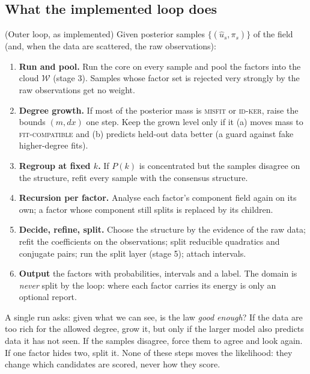 \subsection{What the implemented loop does}
\begin{theorem}{(Outer loop, as implemented)  \impl}\label{thm:loop}
Given posterior samples $\{(\hat u_s,\pi_s)\}$ of the field (and, when the data are scattered, the raw observations):
\begin{enumerate}[nosep]
\item \textbf{Run and pool.} Run the core on every sample and pool the factors into the cloud $\mathcal W$ (stage 3). Samples whose factor set is rejected very strongly by the raw observations get no weight.
\item \textbf{Degree growth.} If most of the posterior mass is \textsc{misfit} or \textsc{id-ker}, raise the bounds $(m,dx)$ one step. Keep the grown level only if it (a) moves mass to \textsc{fit-compatible} and (b) predicts held-out data better (a guard against fake higher-degree fits).
\item \textbf{Regroup at fixed $k$.} If $P(k)$ is concentrated but the samples disagree on the structure, refit every sample with the consensus structure.
\item \textbf{Recursion per factor.} Analyse each factor's component field again on its own; a factor whose component still splits is replaced by its children.
\item \textbf{Decide, refine, split.} Choose the structure by the evidence of the raw data; refit the coefficients on the observations; split reducible quadratics and conjugate pairs; run the split layer (stage 5); attach intervals.
\item \textbf{Output} the factors with probabilities, intervals and a label. The domain is \emph{never} split by the loop: where each factor carries its energy is only an optional report.
\end{enumerate}
\end{theorem}
\begin{intuition}
A single run asks: given what we can see, is the law \emph{good enough}? If the data are too rich for the allowed degree, grow it, but only if the larger model also predicts data it has not seen. If the samples disagree, force them to agree and look again. If one factor hides two, split it. None of these steps moves the likelihood: they change which candidates are scored, never how they score.
\end{intuition}


